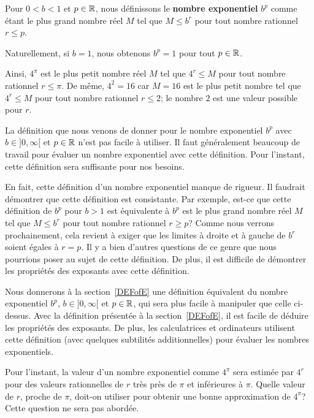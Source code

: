 {\begin{focus}{\dfn}
Pour $0<b<1$ et $p \in \mathbb{R}$, nous définissons le {\bfseries nombre exponentiel}
$b^p$ comme étant le plus grand nombre réel $M$ tel que $M \leq  b^r$
pour tout nombre rationnel $r\leq p$.

Naturellement, si $b=1$, nous obtenons $b^p = 1$ pour tout $p\in \mathbb{R}$.
\end{focus}


Ainsi, $4^\pi$ est le plus petit nombre réel $M$ tel que $4^r \leq M$
pour tout nombre rationnel $r\leq \pi$.  De même, $4^2 = 16$ car
$M=16$ est le plus petit nombre tel que $4^r \leq M$ pour tout nombre
rationnel $r\leq 2$; le nombre $2$ est une valeur possible pour $r$. 

La définition que nous venons de donner pour le nombre exponentiel
$b^p$ avec $b\in]0,\infty[$ et $p\in \mathbb{R}$ n'est pas facile à utiliser.
Il faut généralement beaucoup de travail pour évaluer un nombre
exponentiel avec cette définition.  Pour l'instant, cette définition
sera suffisante pour nos besoins.

En fait, cette définition d'un nombre exponentiel manque de rigueur.
Il faudrait démontrer que cette définition est consistante.  Par
exemple, est-ce que cette définition de $b^p$ pour $b>1$ est
équivalente à \lgm $b^p$ est le plus grand nombre réel $M$ tel que $M
\leq  b^r$ pour tout nombre rationnel $r\geq p$\rgm ?  Comme nous verrons 
prochainement, cela revient à exiger que les limites à droite et à
gauche de $b^r$ soient égales à $r=p$.  Il y a bien d'autres questions
de ce genre que nous pourrions poser au sujet de cette définition.  
De plus, il est difficile de démontrer les propriétés des exposants
avec cette définition.

Nous donnerons à la section~\ref{DEFofE} une définition équivalent du
nombre exponentiel $b^p$, $b\in]0,\infty[$ et $p\in \mathbb{R}$, qui sera
plus facile à manipuler que celle ci-dessus.  Avec la définition
présentée à la section~\ref{DEFofE}, il est facile de déduire les
propriétés des exposants.  De plus, les calculatrices et ordinateurs
utilisent cette définition (avec quelques subtilités additionnelles)
pour évaluer les nombres exponentiels.

Pour l'instant, la valeur d'un nombre exponentiel comme $4^\pi$ sera estimée
par $4^r$ pour des valeurs rationnelles de $r$ très près de $\pi$ et
inférieures à $\pi$.  Quelle valeur de $r$, proche de $\pi$, doit-on
utiliser pour obtenir une bonne approximation de $4^\pi$?  Cette
question ne sera pas abordée.

}
